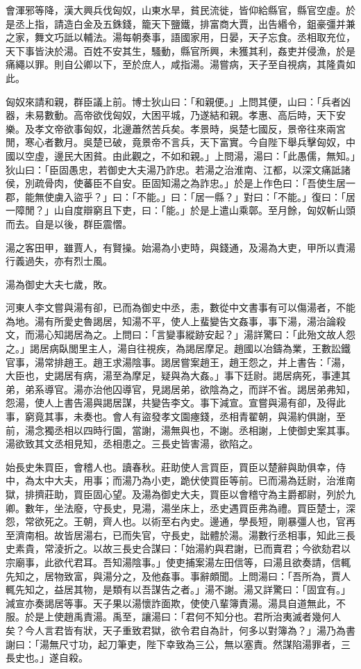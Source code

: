 \begin{pinyinscope}
會渾邪等降，漢大興兵伐匈奴，山東水旱，貧民流徙，皆仰給縣官，縣官空虛。於是丞上指，請造白金及五銖錢，籠天下鹽鐵，排富商大賈，出告緡令，鉏豪彊并兼之家，舞文巧詆以輔法。湯每朝奏事，語國家用，日晏，天子忘食。丞相取充位，天下事皆決於湯。百姓不安其生，騷動，縣官所興，未獲其利，姦吏并侵漁，於是痛繩以罪。則自公卿以下，至於庶人，咸指湯。湯嘗病，天子至自視病，其隆貴如此。

匈奴來請和親，群臣議上前。博士狄山曰：「和親便。」上問其便，山曰：「兵者凶器，未易數動。高帝欲伐匈奴，大困平城，乃遂結和親。孝惠、高后時，天下安樂。及孝文帝欲事匈奴，北邊蕭然苦兵矣。孝景時，吳楚七國反，景帝往來兩宮閒，寒心者數月。吳楚已破，竟景帝不言兵，天下富實。今自陛下舉兵擊匈奴，中國以空虛，邊民大困貧。由此觀之，不如和親。」上問湯，湯曰：「此愚儒，無知。」狄山曰：「臣固愚忠，若御史大夫湯乃詐忠。若湯之治淮南、江都，以深文痛詆諸侯，別疏骨肉，使蕃臣不自安。臣固知湯之為詐忠。」於是上作色曰：「吾使生居一郡，能無使虜入盜乎？」曰：「不能。」曰：「居一縣？」對曰：「不能。」復曰：「居一障閒？」山自度辯窮且下吏，曰：「能。」於是上遣山乘鄣。至月餘，匈奴斬山頭而去。自是以後，群臣震慴。

湯之客田甲，雖賈人，有賢操。始湯為小吏時，與錢通，及湯為大吏，甲所以責湯行義過失，亦有烈士風。

湯為御史大夫七歲，敗。

河東人李文嘗與湯有卻，已而為御史中丞，恚，數從中文書事有可以傷湯者，不能為地。湯有所愛史魯謁居，知湯不平，使人上蜚變告文姦事，事下湯，湯治論殺文，而湯心知謁居為之。上問曰：「言變事縱跡安起？」湯詳驚曰：「此殆文故人怨之。」謁居病臥閭里主人，湯自往視疾，為謁居摩足。趙國以冶鑄為業，王數訟鐵官事，湯常排趙王。趙王求湯陰事。謁居嘗案趙王，趙王怨之，并上書告：「湯，大臣也，史謁居有病，湯至為摩足，疑與為大姦。」事下廷尉。謁居病死，事連其弟，弟系導官。湯亦治他囚導官，見謁居弟，欲陰為之，而詳不省。謁居弟弗知，怨湯，使人上書告湯與謁居謀，共變告李文。事下減宣。宣嘗與湯有卻，及得此事，窮竟其事，未奏也。會人有盜發孝文園瘞錢，丞相青翟朝，與湯約俱謝，至前，湯念獨丞相以四時行園，當謝，湯無與也，不謝。丞相謝，上使御史案其事。湯欲致其文丞相見知，丞相患之。三長史皆害湯，欲陷之。

始長史朱買臣，會稽人也。讀春秋。莊助使人言買臣，買臣以楚辭與助俱幸，侍中，為太中大夫，用事；而湯乃為小吏，跪伏使買臣等前。已而湯為廷尉，治淮南獄，排擠莊助，買臣固心望。及湯為御史大夫，買臣以會稽守為主爵都尉，列於九卿。數年，坐法廢，守長史，見湯，湯坐床上，丞史遇買臣弗為禮。買臣楚士，深怨，常欲死之。王朝，齊人也。以術至右內史。邊通，學長短，剛暴彊人也，官再至濟南相。故皆居湯右，已而失官，守長史，詘體於湯。湯數行丞相事，知此三長史素貴，常淩折之。以故三長史合謀曰：「始湯約與君謝，已而賣君；今欲劾君以宗廟事，此欲代君耳。吾知湯陰事。」使吏捕案湯左田信等，曰湯且欲奏請，信輒先知之，居物致富，與湯分之，及他姦事。事辭頗聞。上問湯曰：「吾所為，賈人輒先知之，益居其物，是類有以吾謀告之者。」湯不謝。湯又詳驚曰：「固宜有。」減宣亦奏謁居等事。天子果以湯懷詐面欺，使使八輩簿責湯。湯具自道無此，不服。於是上使趙禹責湯。禹至，讓湯曰：「君何不知分也。君所治夷滅者幾何人矣？今人言君皆有狀，天子重致君獄，欲令君自為計，何多以對簿為？」湯乃為書謝曰：「湯無尺寸功，起刀筆吏，陛下幸致為三公，無以塞責。然謀陷湯罪者，三長史也。」遂自殺。


\end{pinyinscope}
